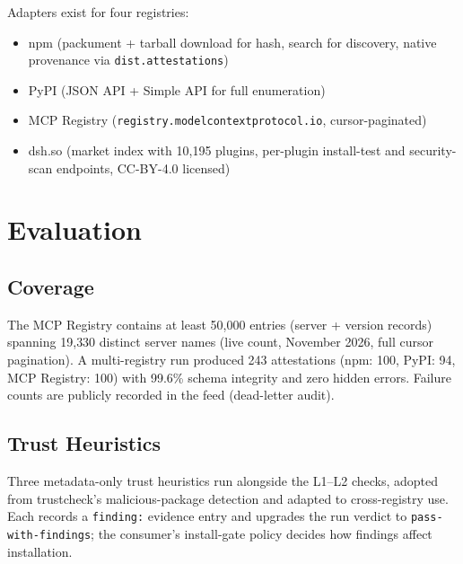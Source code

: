 \documentclass[11pt,a4paper]{article}
\begin{document}
Adapters exist for four registries:
\begin{itemize}[leftmargin=1.5em]
\item npm (packument + tarball download for hash, search for discovery, native
provenance via \texttt{dist.attestations})
\item PyPI (JSON API + Simple API for full enumeration)
\item MCP Registry (\texttt{registry.modelcontextprotocol.io}, cursor-paginated)
\item dsh.so (market index with 10{,}195 plugins, per-plugin install-test and
security-scan endpoints, CC-BY-4.0 licensed)
\end{itemize}

\section{Evaluation}

\subsection{Coverage}

The MCP Registry contains at least 50{,}000 entries (server + version records) spanning 19{,}330 distinct server names (live count, November 2026, full cursor pagination). A multi-registry run produced 243 attestations (npm: 100, PyPI: 94, MCP Registry:
100) with 99.6\% schema integrity and zero hidden errors. Failure counts are
publicly recorded in the feed (dead-letter audit).

\subsection{Trust Heuristics}

Three metadata-only trust heuristics run alongside the L1--L2 checks, adopted
from trustcheck's malicious-package detection and adapted to cross-registry
use. Each records a \texttt{finding:} evidence entry and upgrades the run
verdict to \texttt{pass-with-findings}; the consumer's install-gate policy
decides how findings affect installation.
\end{document}

